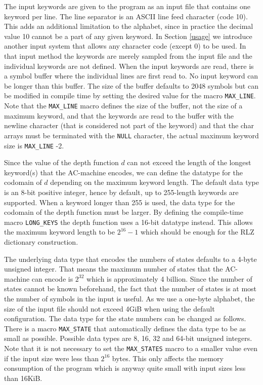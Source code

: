 \documentclass[english,twoside,censored,csm,algorithms-track-2020]{HYthesisML}
\theoremstyle{plain}
\theoremstyle{definition}
\begin{document}
The input keywords are given to the program as an input file that contains one keyword per line. The
line separator is an ASCII line feed character (code 10). This adds an additional limitation to the
alphabet, since in practice the decimal value 10 cannot be a part of any given keyword. In Section
\ref{usage} we introduce another input system that allows any character code (except 0) to be used. In
that input method the keywords are merely sampled from the input file and the individual keywords
are not defined. When the input keywords are read, there is a symbol buffer where the individual lines
are first read to. No input keyword can be longer than this buffer. The size of the buffer defaults
to 2048 symbols but can be modified in compile time by setting the desired value for the macro
\texttt{MAX\_LINE}.
Note that the \texttt{MAX\_LINE} macro defines the size of the buffer, not the size of a maximum
keyword, and
that the keywords are read to the buffer with the newline character (that is considered not part of the keyword)
and that the char arrays must be terminated with the \texttt{NULL} character, the actual maximum
keyword size is \texttt{MAX\_LINE} -2.

Since the value of the depth function $d$ can not exceed the length of the longest keyword(s) that the
AC-machine encodes, we can define the datatype for the codomain of $d$ depending on the maximum
keyword length. The default data type is an 8-bit positive integer, hence by default,
up to 255-length keywords are supported.
When a keyword longer than 255 is used, the data type for the codomain of the depth function
must be larger. By defining the compile-time macro \texttt{LONG\_KEYS} the depth function
uses a 16-bit datatype instead. This allows the maximum keyword length to be $2^{16}-1$ which
should be enough for the RLZ dictionary construction.

The underlying data type that encodes the numbers of states defaults to a 4-byte unsigned integer. That
means the maximum number of states that the AC-machine can encode is $2^{32}$ which is approximately
4 billion. Since the number of states cannot be known beforehand, the fact that the number of states
is at most the number of symbols in the input is useful. As we use a one-byte alphabet, the size
of the input file should not exceed 4GiB when using the default configuration. The data type
for the state numbers can be changed as follows. There is a macro \texttt{MAX\_STATE} that automatically
defines the data type to be as small as possible. Possible data types are 8, 16, 32 and 64-bit
unsigned integers. Note that it is not necessary to set the \texttt{MAX\_STATES} macro to a smaller value
even if the input size were less than $2^{16}$ bytes. This only affects the memory consumption of
the program which is anyway quite small with input sizes less than 16KiB.
\end{document}
